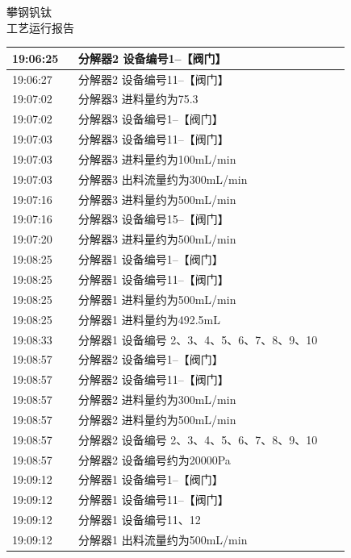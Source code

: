 \documentclass[UTF8,10pt,a4paper,fontset=fandol]{ctexart}
\begin{document}
\hfill
\begin{minipage}[t]{0.48\linewidth}
\centering
{\small 攀钢钒钛}\\[-1mm]
工艺运行报告

\vspace{2mm}
{\scriptsize
\begin{tabular}{|p{0.18\linewidth}|p{0.74\linewidth}|}
\hline
19:06:25 & 分解器2 设备编号1--【阀门】 \\ \hline
19:06:27 & 分解器2 设备编号11--【阀门】 \\ \hline
19:07:02 & 分解器3 进料量约为75.3 \\ \hline
19:07:02 & 分解器3 设备编号1--【阀门】 \\ \hline
19:07:03 & 分解器3 设备编号11--【阀门】 \\ \hline
19:07:03 & 分解器3 进料量约为100mL/min \\ \hline
19:07:03 & 分解器3 出料流量约为300mL/min \\ \hline
19:07:16 & 分解器3 进料量约为500mL/min \\ \hline
19:07:16 & 分解器3 设备编号15--【阀门】 \\ \hline
19:07:20 & 分解器3 进料量约为500mL/min \\ \hline
19:08:25 & 分解器1 设备编号1--【阀门】 \\ \hline
19:08:25 & 分解器1 设备编号11--【阀门】 \\ \hline
19:08:25 & 分解器1 进料量约为500mL/min \\ \hline
19:08:25 & 分解器1 进料量约为492.5mL \\ \hline
19:08:33 & 分解器1 设备编号 2、3、4、5、6、7、8、9、10 \\ \hline
19:08:57 & 分解器2 设备编号1--【阀门】 \\ \hline
19:08:57 & 分解器2 设备编号11--【阀门】 \\ \hline
19:08:57 & 分解器2 进料量约为300mL/min \\ \hline
19:08:57 & 分解器2 进料量约为500mL/min \\ \hline
19:08:57 & 分解器2 设备编号 2、3、4、5、6、7、8、9、10 \\ \hline
19:08:57 & 分解器2 设备编号约为20000Pa \\ \hline
19:09:12 & 分解器1 设备编号1--【阀门】 \\ \hline
19:09:12 & 分解器1 设备编号11--【阀门】 \\ \hline
19:09:12 & 分解器1 设备编号11、12 \\ \hline
19:09:12 & 分解器1 出料流量约为500mL/min \\ \hline
\end{tabular}}
\end{minipage}
\end{document}
